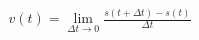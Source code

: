 \documentclass[preview]{standalone}
\begin{document}
\begin{align*}
v(t) = \lim_{\Delta t \to 0} \frac{s(t+\Delta t) - s(t)}{\Delta t}
\end{align*}
\end{document}
